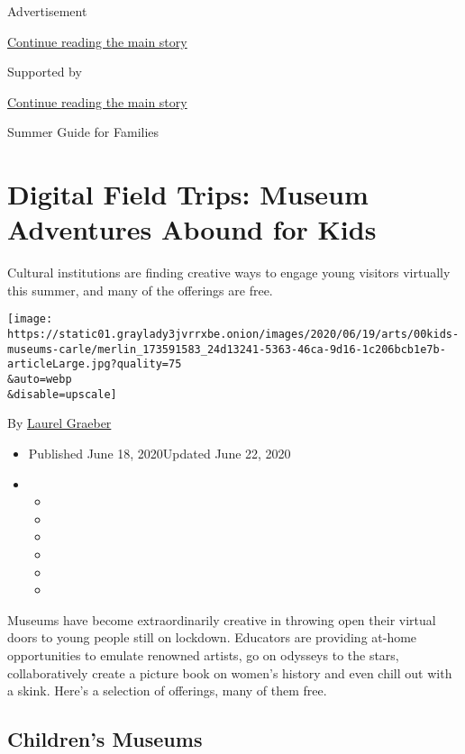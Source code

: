 Advertisement

\protect\hyperlink{after-top}{Continue reading the main story}

Supported by

\protect\hyperlink{after-sponsor}{Continue reading the main story}

Summer Guide for Families

\hypertarget{digital-field-trips-museum-adventures-abound-for-kids}{%
\section{Digital Field Trips: Museum Adventures Abound for
Kids}\label{digital-field-trips-museum-adventures-abound-for-kids}}

Cultural institutions are finding creative ways to engage young visitors
virtually this summer, and many of the offerings are free.

\texttt{[image: https://static01.graylady3jvrrxbe.onion/images/2020/06/19/arts/00kids-museums-carle/merlin\_173591583\_24d13241-5363-46ca-9d16-1c206bcb1e7b-articleLarge.jpg?quality=75\\\&auto=webp\\\&disable=upscale]}

By \href{https://www.nytimes3xbfgragh.onion/by/laurel-graeber}{Laurel
Graeber}

\begin{itemize}
\item
  Published June 18, 2020Updated June 22, 2020
\item
  \begin{itemize}
  \item
  \item
  \item
  \item
  \item
  \item
  \end{itemize}
\end{itemize}

Museums have become extraordinarily creative in throwing open their
virtual doors to young people still on lockdown. Educators are providing
at-home opportunities to emulate renowned artists, go on odysseys to the
stars, collaboratively create a picture book on women's history and even
chill out with a skink. Here's a selection of offerings, many of them
free.

\hypertarget{childrens-museums}{%
\subsection{Children's Museums}\label{childrens-museums}}

